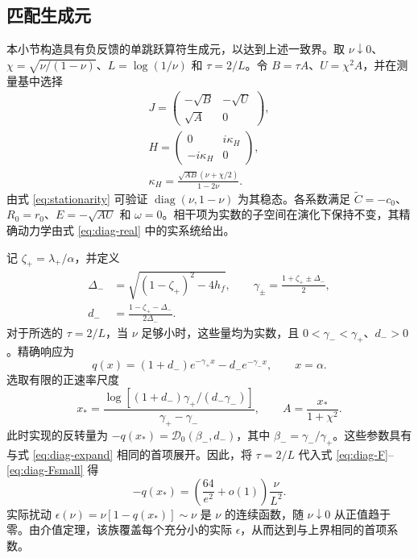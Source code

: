 \documentclass[aps,pra,reprint,amsmath,amssymb,nofootinbib,floatfix,longbibliography]{revtex4-2}
\theoremstyle{aps}
\DeclareMathOperator{\diag}{diag}
\newcommand{\eps}{\epsilon}
\begin{document}
\subsection{匹配生成元}

本小节构造具有负反馈的单跳跃算符生成元，以达到上述一致界。取 $\nu\downarrow0$、$\chi=\sqrt{\nu/(1-\nu)}$、$L=\log(1/\nu)$ 和 $\tau=2/L$。令 $B=\tau A$、$U=\chi^2A$，并在测量基中选择
\begin{equation}\label{eq:diag-jump}
 \begin{gathered}
 J=\begin{pmatrix}-\sqrt B&-\sqrt U\\\sqrt A&0\end{pmatrix},\\
 H=\begin{pmatrix}0&i\kappa_H\\-i\kappa_H&0\end{pmatrix},\\
 \kappa_H=\frac{\sqrt{AB}(\nu+\chi/2)}{1-2\nu}.
 \end{gathered}
\end{equation}
由式 \eqref{eq:stationarity} 可验证 $\diag(\nu,1-\nu)$ 为其稳态。各系数满足
$\widetilde C=-c_0$、$R_0=r_0$、$E=-\sqrt{AU}$ 和 $\omega=0$。相干项为实数的子空间在演化下保持不变，其精确动力学由式 \eqref{eq:diag-real} 中的实系统给出。

记 $\zeta_+=\lambda_+/\alpha$，并定义
\begin{equation}\label{eq:diag-negative-spectrum}
 \begin{split}
 \Delta_-&=\sqrt{(1-\zeta_+)^2-4h_f},\qquad
 \gamma_\pm=\frac{1+\zeta_+\pm\Delta_-}{2},\\
 d_-&=\frac{1-\zeta_+-\Delta_-}{2\Delta_-}.
 \end{split}
\end{equation}
对于所选的 $\tau=2/L$，当 $\nu$ 足够小时，这些量均为实数，且 $0<\gamma_-<\gamma_+$、$d_->0$。精确响应为
\begin{equation}\label{eq:diag-qexact}
 q(x)=(1+d_-)e^{-\gamma_+x}-d_-e^{-\gamma_-x},\qquad x=\alpha.
\end{equation}
选取有限的正速率尺度
\begin{equation}\label{eq:diag-xstar}
 x_*=\frac{\log[(1+d_-)\gamma_+/(d_-\gamma_-)]}
 {\gamma_+-\gamma_-},\qquad A=\frac{x_*}{1+\chi^2}.
\end{equation}
此时实现的反转量为
$-q(x_*)=\mathcal D_0(\beta_-,d_-)$，其中 $\beta_-=\gamma_-/\gamma_+$。这些参数具有与式 \eqref{eq:diag-expand} 相同的首项展开。因此，将 $\tau=2/L$ 代入式 \eqref{eq:diag-F}--\eqref{eq:diag-Fsmall} 得
\begin{equation}\label{eq:diag-lower}
 -q(x_*)=\left(\frac{64}{e^2}+o(1)\right)\frac\nu{L^2}.
\end{equation}
实际扰动 $\eps(\nu)=\nu[1-q(x_*)]\sim\nu$ 是 $\nu$ 的连续函数，随 $\nu\downarrow0$ 从正值趋于零。由介值定理，该族覆盖每个充分小的实际 $\eps$，从而达到与上界相同的首项系数。
\end{document}
